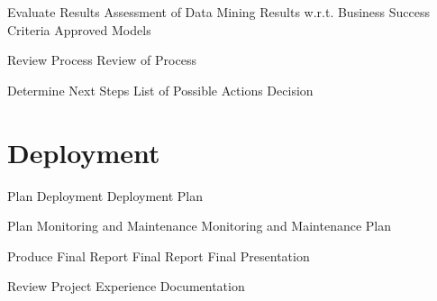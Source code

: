 Evaluate Results
Assessment of Data
Mining Results w.r.t.
Business Success
Criteria
Approved Models


Review Process
Review of Process

Determine Next Steps
List of Possible Actions
Decision



\section{Deployment} %
\label{sub:deployment}
Plan Deployment
Deployment Plan

Plan Monitoring and
Maintenance
Monitoring and
Maintenance Plan

Produce Final Report
Final Report
Final Presentation

Review Project
Experience
Documentation




